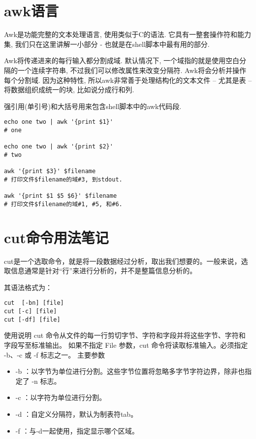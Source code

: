 \section{awk语言}
Awk是功能完整的文本处理语言, 使用类似于C的语法. 它具有一整套操作符和能力集, 我们只在这里讲解一小部分 - 也就是在shell脚本中最有用的部分.

Awk将传递进来的每行输入都分割成域. 默认情况下, 一个域指的就是使用空白分隔的一个连续字符串, 不过我们可以修改属性来改变分隔符. Awk将会分析并操作每个分割域. 因为这种特性, 所以awk非常善于处理结构化的文本文件 -- 尤其是表 -- 将数据组织成统一的块, 比如说分成行和列.

强引用(单引号)和大括号用来包含shell脚本中的awk代码段.

\begin{verbatim}
echo one two | awk '{print $1}'
# one

echo one two | awk '{print $2}'
# two

awk '{print $3}' $filename
# 打印文件$filename的域#3, 到stdout. 
 
awk '{print $1 $5 $6}' $filename
# 打印文件$filename的域#1, #5, 和#6. 
\end{verbatim}


\section{cut命令用法笔记}

cut是一个选取命令，就是将一段数据经过分析，取出我们想要的。一般来说，选取信息通常是针对“行”来进行分析的，并不是整篇信息分析的。

其语法格式为：
\begin{verbatim}
cut  [-bn] [file] 
cut [-c] [file]  
cut [-df] [file]
\end{verbatim}

使用说明
cut 命令从文件的每一行剪切字节、字符和字段并将这些字节、字符和字段写至标准输出。
如果不指定 File 参数，cut 命令将读取标准输入。必须指定 -b、-c 或 -f 标志之一。
主要参数

\begin{itemize}
    \item -b ：以字节为单位进行分割。这些字节位置将忽略多字节字符边界，除非也指定了 -n 标志。
    \item -c ：以字符为单位进行分割。
    \item -d ：自定义分隔符，默认为制表符tab。
    \item -f  ：与-d一起使用，指定显示哪个区域。
\end{itemize}

